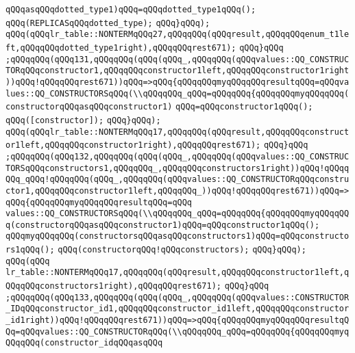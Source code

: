 \verb|qQQqasqQQqdotted_type1)qQQq=qQQqdotted_type1qQQq();|\newline
\verb|qQQq(REPLICASqQQqdotted_type);|\newline
\verb|qQQq}qQQq);|\newline
\verb|qQQq(qQQqlr_table::NONTERMqQQq27,qQQqqQQq(qQQqresult,qQQqqQQqenum_t1left,qQQqqQQqdotted_type1right),qQQqqQQqrest671);|\newline
\verb|qQQq}qQQq|\newline
\verb|;qQQqqQQq(qQQq131,qQQqqQQq(qQQq(qQQq_,qQQqqQQq(qQQqvalues::QQ_CONSTRUCTORqQQqconstructor1,qQQqqQQqconstructor1left,qQQqqQQqconstructor1right))qQQq!qQQqqQQqrest671))qQQq=>qQQq{qQQqqQQqmyqQQqqQQqresultqQQq=qQQqvalues::QQ_CONSTRUCTORSqQQq(\\qQQqqQQq_qQQq=qQQqqQQq{qQQqqQQqmyqQQqqQQq(constructorqQQqasqQQqconstructor1)|\newline
\verb|qQQq=qQQqconstructor1qQQq();|\newline
\verb|qQQq([constructor]);|\newline
\verb|qQQq}qQQq);|\newline
\verb|qQQq(qQQqlr_table::NONTERMqQQq17,qQQqqQQq(qQQqresult,qQQqqQQqconstructor1left,qQQqqQQqconstructor1right),qQQqqQQqrest671);|\newline
\verb|qQQq}qQQq|\newline
\verb|;qQQqqQQq(qQQq132,qQQqqQQq(qQQq(qQQq_,qQQqqQQq(qQQqvalues::QQ_CONSTRUCTORSqQQqconstructors1,qQQqqQQq_,qQQqqQQqconstructors1right))qQQq!qQQqqQQq_qQQq!qQQqqQQq(qQQq_,qQQqqQQq(qQQqvalues::QQ_CONSTRUCTORqQQqconstructor1,qQQqqQQqconstructor1left,qQQqqQQq_))qQQq!qQQqqQQqrest671))qQQq=>qQQq{qQQqqQQqmyqQQqqQQqresultqQQq=qQQq|\newline
\verb|values::QQ_CONSTRUCTORSqQQq(\\qQQqqQQq_qQQq=qQQqqQQq{qQQqqQQqmyqQQqqQQq(constructorqQQqasqQQqconstructor1)qQQq=qQQqconstructor1qQQq();|\newline
\verb|qQQqmyqQQqqQQq(constructorsqQQqasqQQqconstructors1)qQQq=qQQqconstructors1qQQq();|\newline
\verb|qQQq(constructorqQQq!qQQqconstructors);|\newline
\verb|qQQq}qQQq);|\newline
\verb|qQQq(qQQq|\newline
\verb|lr_table::NONTERMqQQq17,qQQqqQQq(qQQqresult,qQQqqQQqconstructor1left,qQQqqQQqconstructors1right),qQQqqQQqrest671);|\newline
\verb|qQQq}qQQq|\newline
\verb|;qQQqqQQq(qQQq133,qQQqqQQq(qQQq(qQQq_,qQQqqQQq(qQQqvalues::CONSTRUCTOR_IDqQQqconstructor_id1,qQQqqQQqconstructor_id1left,qQQqqQQqconstructor_id1right))qQQq!qQQqqQQqrest671))qQQq=>qQQq{qQQqqQQqmyqQQqqQQqresultqQQq=qQQqvalues::QQ_CONSTRUCTORqQQq(\\qQQqqQQq_qQQq=qQQqqQQq{qQQqqQQqmyqQQqqQQq(constructor_idqQQqasqQQq|\newline
